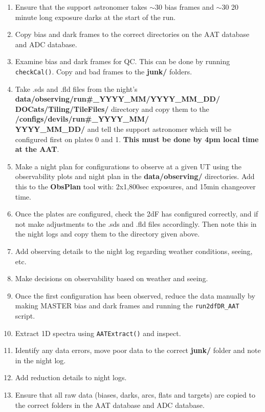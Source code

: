 \documentclass[12pt]{article}
\begin{document}
\begin{enumerate}

\item Ensure that the support astronomer takes $\sim30$ bias frames and $\sim30$ 20 minute long exposure darks at the start of the run.

\item Copy bias and dark frames to the correct directories on the AAT database and ADC database. 

\item Examine bias and dark frames for QC. This can be done by running \texttt{checkCal()}. Copy and bad frames to the \textbf{junk/} folders.

\item Take .sds and .fld files from the night's \textbf{data/observing/run\#\_YYYY\_MM/YYYY\_MM\_DD/ \\
DOCats/Tiling/TileFiles/} directory and copy them to the \textbf{/configs/devils/run\#\_YYYY\_MM/ \\
YYYY\_MM\_DD/} and tell the support astronomer which will be configured first on plates 0 and 1.   \textbf{\textcolor{PineGreen}{This must be done by 4pm local time at the AAT}}.

\item Make a night plan for configurations to observe at a given UT using the observability plots and night plan in the \textbf{data/observing/} directories. Add this to the \textbf{ObsPlan} tool with: 2x1,800sec exposures, and 15min changeover time. 

\item Once the plates are configured, check the 2dF has configured correctly, and if not make adjustments to the .sds and .fld files accordingly. Then note this in the night logs and copy them to the directory given above. 

\item Add observing details to the night log regarding weather conditions, seeing, etc.

\item Make decisions on observability based on weather and seeing. 

\item Once the first configuration has been observed, reduce the data manually by making MASTER bias and dark frames and running the \texttt{run2dfDR\_AAT} script.   

\item Extract 1D spectra using \texttt{AATExtract()} and inspect.

\item Identify any data errors, move poor data to the correct \textbf{junk/} folder and note in the night log.

\item Add reduction details to night logs.

\item Ensure that all raw data (biases, darks, arcs, flats and targets) are copied to the correct folders in the AAT database and ADC database.

\end{enumerate}
\end{document}
